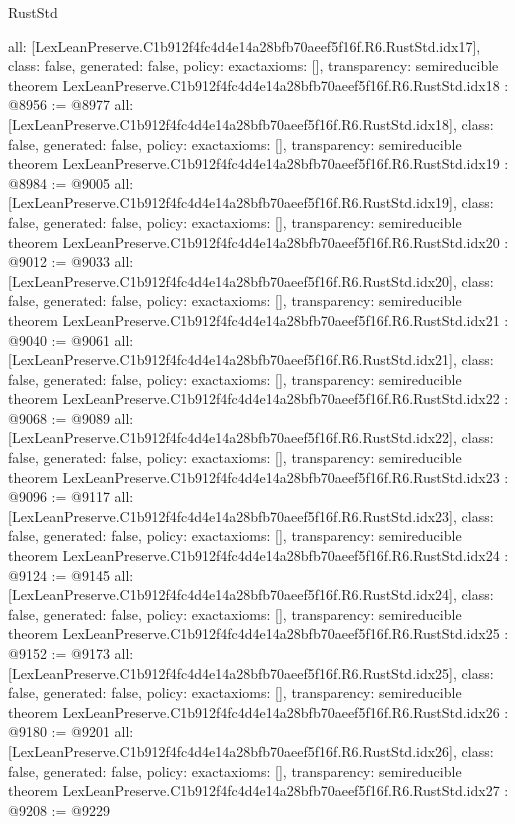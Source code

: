 \begin{lexlean}{RustStd}
\begin{coremodule}
{  all: [LexLeanPreserve.C1b912f4fc4d4e14a28bfb70aeef5f16f.R6.RustStd.idx17],
  class: false,
  generated: false,
  policy: exact{axioms: []},
  transparency: semireducible
}
theorem LexLeanPreserve.C1b912f4fc4d4e14a28bfb70aeef5f16f.R6.RustStd.idx18 : @8956 := @8977 {
  all: [LexLeanPreserve.C1b912f4fc4d4e14a28bfb70aeef5f16f.R6.RustStd.idx18],
  class: false,
  generated: false,
  policy: exact{axioms: []},
  transparency: semireducible
}
theorem LexLeanPreserve.C1b912f4fc4d4e14a28bfb70aeef5f16f.R6.RustStd.idx19 : @8984 := @9005 {
  all: [LexLeanPreserve.C1b912f4fc4d4e14a28bfb70aeef5f16f.R6.RustStd.idx19],
  class: false,
  generated: false,
  policy: exact{axioms: []},
  transparency: semireducible
}
theorem LexLeanPreserve.C1b912f4fc4d4e14a28bfb70aeef5f16f.R6.RustStd.idx20 : @9012 := @9033 {
  all: [LexLeanPreserve.C1b912f4fc4d4e14a28bfb70aeef5f16f.R6.RustStd.idx20],
  class: false,
  generated: false,
  policy: exact{axioms: []},
  transparency: semireducible
}
theorem LexLeanPreserve.C1b912f4fc4d4e14a28bfb70aeef5f16f.R6.RustStd.idx21 : @9040 := @9061 {
  all: [LexLeanPreserve.C1b912f4fc4d4e14a28bfb70aeef5f16f.R6.RustStd.idx21],
  class: false,
  generated: false,
  policy: exact{axioms: []},
  transparency: semireducible
}
theorem LexLeanPreserve.C1b912f4fc4d4e14a28bfb70aeef5f16f.R6.RustStd.idx22 : @9068 := @9089 {
  all: [LexLeanPreserve.C1b912f4fc4d4e14a28bfb70aeef5f16f.R6.RustStd.idx22],
  class: false,
  generated: false,
  policy: exact{axioms: []},
  transparency: semireducible
}
theorem LexLeanPreserve.C1b912f4fc4d4e14a28bfb70aeef5f16f.R6.RustStd.idx23 : @9096 := @9117 {
  all: [LexLeanPreserve.C1b912f4fc4d4e14a28bfb70aeef5f16f.R6.RustStd.idx23],
  class: false,
  generated: false,
  policy: exact{axioms: []},
  transparency: semireducible
}
theorem LexLeanPreserve.C1b912f4fc4d4e14a28bfb70aeef5f16f.R6.RustStd.idx24 : @9124 := @9145 {
  all: [LexLeanPreserve.C1b912f4fc4d4e14a28bfb70aeef5f16f.R6.RustStd.idx24],
  class: false,
  generated: false,
  policy: exact{axioms: []},
  transparency: semireducible
}
theorem LexLeanPreserve.C1b912f4fc4d4e14a28bfb70aeef5f16f.R6.RustStd.idx25 : @9152 := @9173 {
  all: [LexLeanPreserve.C1b912f4fc4d4e14a28bfb70aeef5f16f.R6.RustStd.idx25],
  class: false,
  generated: false,
  policy: exact{axioms: []},
  transparency: semireducible
}
theorem LexLeanPreserve.C1b912f4fc4d4e14a28bfb70aeef5f16f.R6.RustStd.idx26 : @9180 := @9201 {
  all: [LexLeanPreserve.C1b912f4fc4d4e14a28bfb70aeef5f16f.R6.RustStd.idx26],
  class: false,
  generated: false,
  policy: exact{axioms: []},
  transparency: semireducible
}
theorem LexLeanPreserve.C1b912f4fc4d4e14a28bfb70aeef5f16f.R6.RustStd.idx27 : @9208 := @9229 {
}
\end{coremodule}
\end{lexlean}
